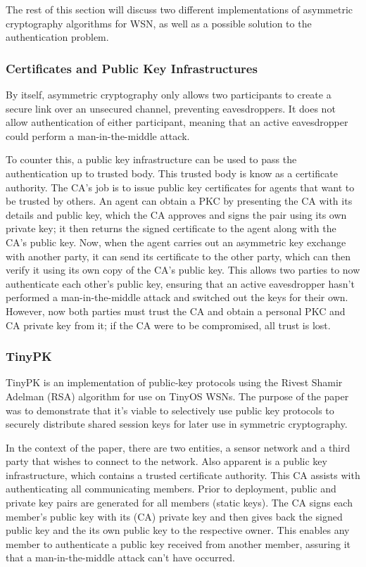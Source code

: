 \documentclass{mprop}
\begin{document}
The rest of this section will discuss two different implementations of asymmetric cryptography algorithms for WSN, as well as a possible solution to the authentication problem.

\subsubsection{Certificates and Public Key Infrastructures} %
\label{ssub:certificates_and_public_key_infrastructures}
By itself, asymmetric cryptography only allows two participants to create a secure link over an unsecured channel, preventing eavesdroppers. It does not allow authentication of either participant, meaning that an active eavesdropper could perform a man-in-the-middle attack. 

To counter this, a public key infrastructure can be used to pass the authentication up to trusted body. This trusted body is know as a certificate authority. The CA's job is to issue public key certificates for agents that want to be trusted by others. An agent can obtain a PKC by presenting the CA with its details and public key, which the CA approves and signs the pair using its own private key; it then returns the signed certificate to the agent along with the CA's public key. Now, when the agent carries out an asymmetric key exchange with another party, it can send its certificate to the other party, which can then verify it using its own copy of the CA's public key. This allows two parties to now authenticate each other's public key, ensuring that an active eavesdropper hasn't performed a man-in-the-middle attack and switched out the keys for their own. However, now both parties must trust the CA and obtain a personal PKC and CA private key from it; if the CA were to be compromised, all trust is lost.


\subsubsection{TinyPK} %
\label{ssub:tinypk}
TinyPK is an implementation of public-key protocols using the Rivest Shamir Adelman (RSA) algorithm for use on TinyOS WSNs\cite{TinyPK}. The purpose of the paper was to demonstrate that it's viable to selectively use public key protocols to securely distribute shared session keys for later use in symmetric cryptography.

In the context of the paper, there are two entities, a sensor network and a third party that wishes to connect to the network. Also apparent is a public key infrastructure, which contains a trusted certificate authority. This CA assists with authenticating all communicating members. Prior to deployment, public and private key pairs are generated for all members (static keys). The CA signs each member's public key with its (CA) private key and then gives back the signed public key and the its own public key to the respective owner. This enables any member to authenticate a public key received from another member, assuring it that a man-in-the-middle attack can't have occurred.
\end{document}

